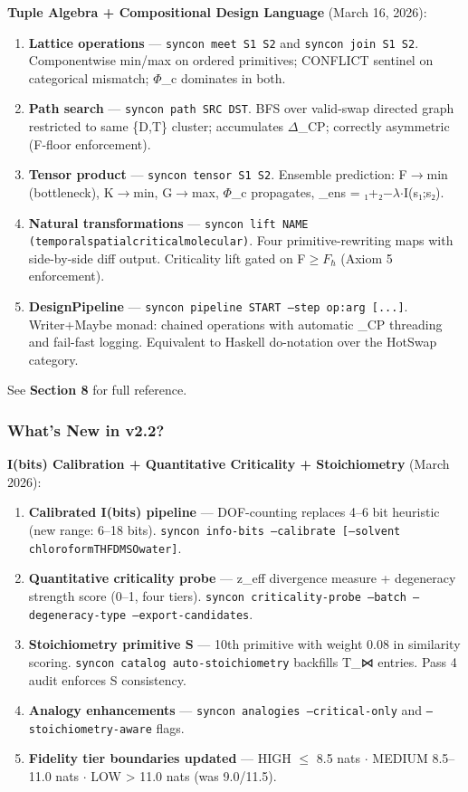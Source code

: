 \documentclass[12pt,a4paper]{article}
\begin{document}
\textbf{Tuple Algebra + Compositional Design Language} (March 16, 2026):

\begin{enumerate}
    \item \textbf{Lattice operations} --- \texttt{syncon meet S1 S2} and \texttt{syncon join S1 S2}. Componentwise min/max on ordered primitives; CONFLICT sentinel on categorical mismatch; $\Phi$\_c dominates in both.
    \item \textbf{Path search} --- \texttt{syncon path SRC DST}. BFS over valid-swap directed graph restricted to same \{D,T\} cluster; accumulates $\Delta$\xi\_CP; correctly asymmetric (F-floor enforcement).
    \item \textbf{Tensor product} --- \texttt{syncon tensor S1 S2}. Ensemble prediction: F$\rightarrow$min (bottleneck), K$\rightarrow$min, G$\rightarrow$max, $\Phi$\_c propagates, \xi\_ens = \xi₁+\xi₂$-$$\lambda$$\cdot$I(s₁;s₂).
    \item \textbf{Natural transformations} --- \texttt{syncon lift NAME (temporal\textbar{}spatial\textbar{}critical\textbar{}molecular)}. Four primitive-rewriting maps with side-by-side diff output. Criticality lift gated on F$\geq$$F_{\hbar}$ (Axiom 5 enforcement).
    \item \textbf{DesignPipeline} --- \texttt{syncon pipeline START --step op:arg {[}...{]}}. Writer+Maybe monad: chained operations with automatic \xi\_CP threading and fail-fast logging. Equivalent to Haskell do-notation over the HotSwap category.
\end{enumerate}

See \textbf{Section 8} for full reference.

\subsubsection{What's New in v2.2?}

\textbf{I(bits) Calibration + Quantitative Criticality + Stoichiometry} (March 2026):

\begin{enumerate}
    \item \textbf{Calibrated I(bits) pipeline} --- DOF-counting replaces 4--6 bit heuristic (new range: 6--18 bits). \texttt{syncon info-bits --calibrate {[}--solvent chloroform\textbar{}THF\textbar{}DMSO\textbar{}water{]}}.
    \item \textbf{Quantitative criticality probe} --- z\_eff divergence measure + degeneracy strength score (0--1, four tiers). \texttt{syncon criticality-probe --batch --degeneracy-type --export-candidates}.
    \item \textbf{Stoichiometry primitive S} --- 10th primitive with weight 0.08 in similarity scoring. \texttt{syncon catalog auto-stoichiometry} backfills T\_⋈ entries. Pass 4 audit enforces S consistency.
    \item \textbf{Analogy enhancements} --- \texttt{syncon analogies --critical-only} and \texttt{--stoichiometry-aware} flags.
    \item \textbf{Fidelity tier boundaries updated} --- HIGH $\leq$ 8.5 nats $\cdot$ MEDIUM 8.5--11.0 nats $\cdot$ LOW \textgreater{} 11.0 nats (was 9.0/11.5).
\end{enumerate}
\end{document}
